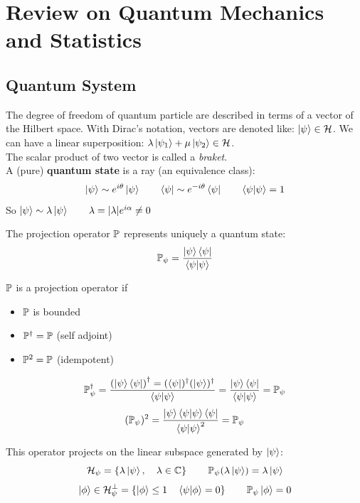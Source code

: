 \section{Review on Quantum Mechanics and Statistics}
\subsection{Quantum System}
The degree of freedom of quantum particle are described in terms of a vector of the Hilbert space. With Dirac's notation, vectors are denoted like: $\left|\psi\right\rangle \in \mathcal{H} $. We can have a linear superposition: $ \lambda \left|\psi_1\right\rangle + \mu\left|\psi_2\right\rangle \in \mathcal{H}$.\\
The scalar product of two vector is called a \textit{braket}.\\

A (pure) \textbf{quantum state} is a ray (an equivalence class): 
$$\left|\psi\right\rangle \sim e^{i\theta}\left|\psi\right\rangle \qquad \left\langle\psi\right| \sim e^{-i\theta}\left\langle\psi\right| \qquad \left\langle \psi \middle| \psi \right\rangle = 1$$
So $\left|\psi\right\rangle \sim \lambda \left|\psi\right\rangle \qquad \lambda = |\lambda| e^{i\alpha} \ne 0$

The projection operator $\mathbb{P}$ represents uniquely a quantum state: 
$$\mathbb{P}_\psi = \frac{\left|\psi\right\rangle\left\langle\psi\right|}{\left\langle \psi \middle| \psi \right\rangle}$$

$\mathbb{P}$ is a projection operator if
\begin{itemize}
    \item $\mathbb{P}$ is bounded
    \item $\mathbb{P}^\dag = \mathbb{P}$  (self adjoint)
    \item $\mathbb{P}^2 = \mathbb{P}$ (idempotent)
\end{itemize}

\Pf
$$\mathbb{P}^\dag_\psi = \frac{\left(\left|\psi\right\rangle\left\langle\psi\right|\right)^\dag = (\left\langle\psi\right|)^\dag(\left|\psi\right\rangle)^\dag}{\left\langle \psi \middle| \psi \right\rangle} = \frac{\left|\psi\right\rangle\left\langle\psi\right|}{\left\langle \psi \middle| \psi \right\rangle} = \mathbb{P}_\psi$$
$$ (\mathbb{P}_\psi)^2 = \frac{\left|\psi\right\rangle\left\langle \psi \middle| \psi \right\rangle \left\langle\psi\right|}{\left\langle \psi \middle| \psi \right\rangle^2} = \mathbb{P}_\psi$$
\EndPf

This operator projects on the linear subspace generated by $\left|\psi\right\rangle$:
$$\mathcal{H}_\psi = \left\{ \lambda\left|\psi\right\rangle, \quad \lambda \in \mathbb{C}\right\} \qquad \mathbb{P}_\psi(\lambda\left|\psi\right\rangle) = \lambda\left|\psi\right\rangle$$
$$\left|\phi\right\rangle \in \mathcal{H}_\psi^\perp = \left\{\left|\phi\right\rangle \le 1 \quad \left\langle \psi \middle| \phi \right\rangle = 0\right\} \qquad \mathbb{P}_\psi\left|\phi\right\rangle = 0$$

\vspace{10pt}


